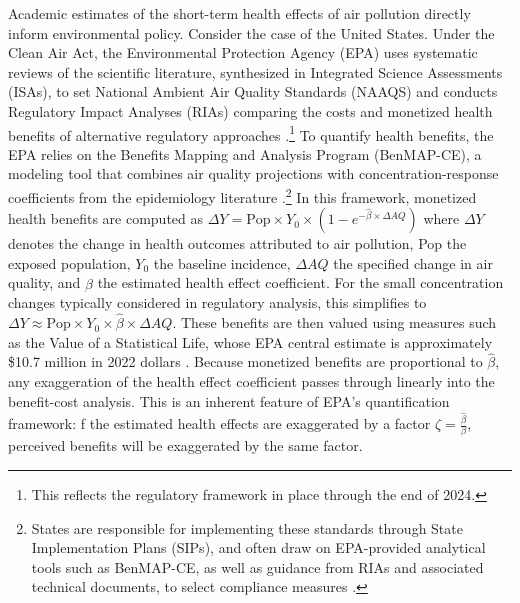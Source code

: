 \documentclass[12pt]{article}
\begin{document}
		Academic estimates of the short-term health effects of air pollution directly inform environmental policy. Consider the case of the United States. Under the Clean Air Act, the Environmental Protection Agency (EPA) uses systematic reviews of the scientific literature, synthesized in Integrated Science Assessments (ISAs), to set National Ambient Air Quality Standards (NAAQS) and conducts Regulatory Impact Analyses (RIAs) comparing the costs and monetized health benefits of alternative regulatory approaches \citep{u.s.epa_preamble_2015, u.s.epa_final_2024}.\footnote{This reflects the regulatory framework in place through the end of 2024.} To quantify health benefits, the EPA relies on the Benefits Mapping and Analysis Program (BenMAP-CE), a modeling tool that combines air quality projections with concentration-response coefficients from the epidemiology literature \citep{sacks_environmental_2018}.\footnote{States are responsible for implementing these standards through State Implementation Plans (SIPs), and often draw on EPA-provided analytical tools such as BenMAP-CE, as well as guidance from RIAs and associated technical documents, to select compliance measures \citep{u.s.epa_environmental_2023}.} In this framework, monetized health benefits are computed as $\Delta Y = \text{Pop} \times Y_0 \times (1 - e^{-\hat{\beta} \times \Delta AQ})$ where $\Delta Y$ denotes the change in health outcomes attributed to air pollution, Pop the exposed population, $Y_0$ the baseline incidence, $\Delta AQ$ the specified change in air quality, and $\hat{\beta}$ the estimated health effect coefficient. For the small concentration changes typically considered in regulatory analysis, this simplifies to $\Delta Y \approx \text{Pop} \times Y_0 \times \hat{\beta} \times \Delta AQ$. These benefits are then valued using measures such as the Value of a Statistical Life, whose EPA central estimate is approximately \$10.7 million in 2022 dollars \citep{u.s.epa_guidelines_2024}. Because monetized benefits are proportional to $\hat{\beta}$, any exaggeration of the health effect coefficient passes through linearly into the benefit-cost analysis. This is an inherent feature of EPA's quantification framework: f the estimated health effects are exaggerated by a factor $\zeta = \frac{\hat{\beta}}{\beta}$, perceived benefits will be exaggerated by the same factor. 
		
\end{document}

